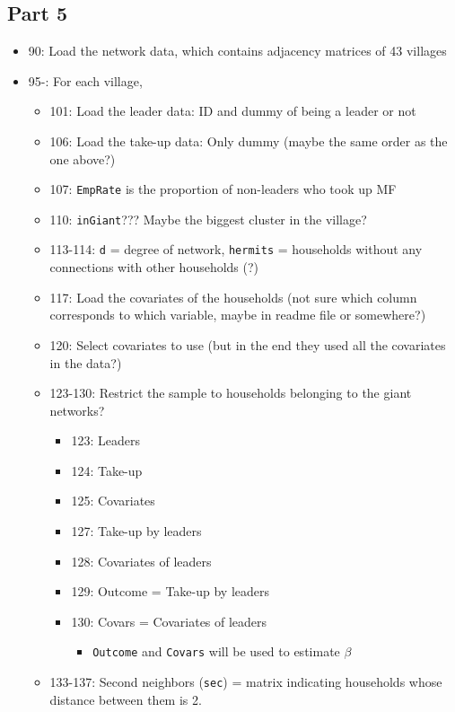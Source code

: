 \documentclass[10pt,letterpaper]{article}
\begin{document}
\subsection*{Part 5}
\begin{itemize}
  \item 90: Load the network data, which contains adjacency matrices of 43 villages
  \item 95-: For each village,
    \begin{itemize}
      \item 101: Load the leader data: ID and dummy of being a leader or not
      \item 106: Load the take-up data: Only dummy (maybe the same order as the one above?)
      \item 107: \texttt{EmpRate} is the proportion of non-leaders who took up MF
      \item 110: \texttt{inGiant}??? 
        Maybe the biggest cluster in the village?
      \item 113-114: \texttt{d} = degree of network, \texttt{hermits} = households without any connections with other households (?)
      \item 117: Load the covariates of the households (not sure which column corresponds to which variable, maybe in readme file or somewhere?)
      \item 120: Select covariates to use (but in the end they used all the covariates in the data?)
      \item 123-130: Restrict the sample to households belonging to the giant networks?
        \begin{itemize}
          \item 123: Leaders
          \item 124: Take-up
          \item 125: Covariates
          \item 127: Take-up by leaders
          \item 128: Covariates of leaders
          \item 129: Outcome = Take-up by leaders
          \item 130: Covars = Covariates of leaders
            \begin{itemize}
              \item \texttt{Outcome} and \texttt{Covars} will be used to estimate $\beta$
            \end{itemize}
        \end{itemize}
      \item 133-137: Second neighbors (\texttt{sec}) = matrix indicating households whose distance between them is 2.

\end{itemize}
\end{itemize}
\end{document}

